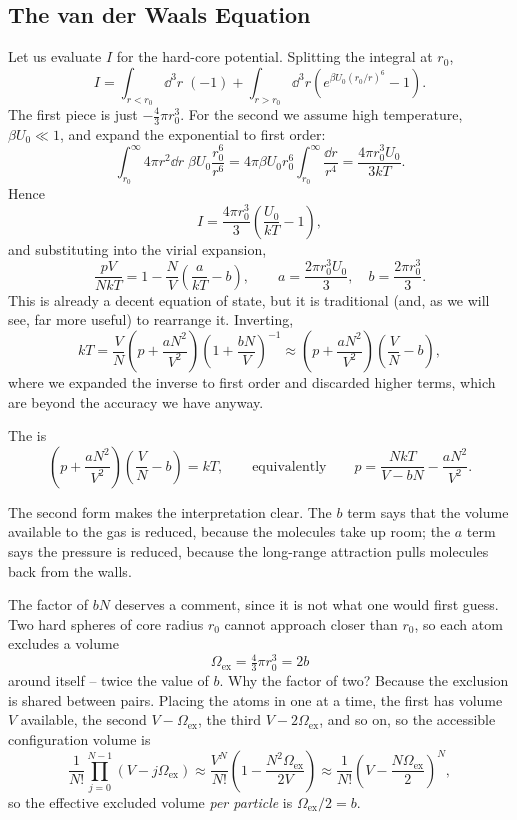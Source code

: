 \subsection{The van der Waals Equation}\label{sec:vdwderive}

Let us evaluate $I$ for the hard-core potential. Splitting the integral at $r_0$,
$$
I = \int_{r<r_0}\dd^3 r\;(-1) + \int_{r>r_0}\dd^3 r\left(e^{\beta U_0 (r_0/r)^6}-1\right).
$$
The first piece is just $-\tfrac 43 \pi r_0^3$. For the second we assume high temperature, $\beta U_0 \ll 1$, and expand the exponential to first order:
$$
\int_{r_0}^\infty 4\pi r^2 \dd r\; \beta U_0 \frac{r_0^6}{r^6} = 4\pi \beta U_0 r_0^6 \int_{r_0}^\infty \frac{\dd r}{r^4} = \frac{4\pi r_0^3 U_0}{3kT}.
$$
Hence
$$
I = \frac{4\pi r_0^3}{3}\left(\frac{U_0}{kT}-1\right),
$$
and substituting into the virial expansion,
$$
\frac{pV}{NkT} = 1 - \frac NV\left(\frac{a}{kT}-b\right), \qquad a = \frac{2\pi r_0^3 U_0}{3}, \quad b = \frac{2\pi r_0^3}{3}.
$$
This is already a decent equation of state, but it is traditional (and, as we will see, far more useful) to rearrange it. Inverting,
$$
kT = \frac VN\left(p + \frac{aN^2}{V^2}\right)\left(1 + \frac{bN}{V}\right)^{-1} \approx \left(p + \frac{aN^2}{V^2}\right)\left(\frac VN - b\right),
$$
where we expanded the inverse to first order and discarded higher terms, which are beyond the accuracy we have anyway.

\begin{definition}
	The  is
	$$
	\left(p + \frac{aN^2}{V^2}\right)\left(\frac VN - b\right) = kT, \qquad \text{equivalently} \qquad p = \frac{NkT}{V - bN} - \frac{aN^2}{V^2}.
	$$
\end{definition}

The second form makes the interpretation clear. The $b$ term says that the volume available to the gas is reduced, because the molecules take up room; the $a$ term says the pressure is reduced, because the long-range attraction pulls molecules back from the walls.

The factor of $bN$ deserves a comment, since it is not what one would first guess. Two hard spheres of core radius $r_0$ cannot approach closer than $r_0$, so each atom excludes a volume
$$
\Omega_{\mathrm{ex}} = \tfrac 43 \pi r_0^3 = 2b
$$
around itself -- twice the value of $b$. Why the factor of two? Because the exclusion is shared between pairs. Placing the atoms in one at a time, the first has volume $V$ available, the second $V - \Omega_{\mathrm{ex}}$, the third $V - 2\Omega_{\mathrm{ex}}$, and so on, so the accessible configuration volume is
$$
\frac{1}{N!}\prod_{j=0}^{N-1}\left(V - j\Omega_{\mathrm{ex}}\right) \approx \frac{V^N}{N!}\left(1 - \frac{N^2\Omega_{\mathrm{ex}}}{2V}\right) \approx \frac{1}{N!}\left(V - \frac{N\Omega_{\mathrm{ex}}}{2}\right)^N,
$$
so the effective excluded volume \emph{per particle} is $\Omega_{\mathrm{ex}}/2 = b$.

